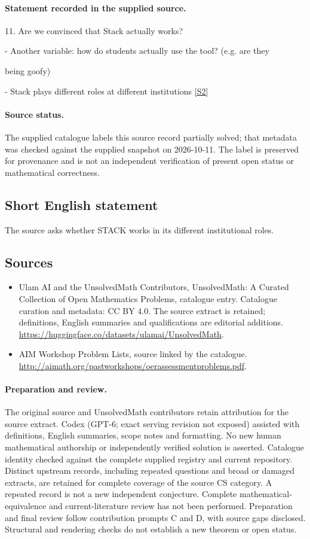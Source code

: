\documentclass[11pt]{article}
\begin{document}
\paragraph{Statement recorded in the supplied source.}
11. Are we convinced that Stack actually works?

- Another variable: how do students actually use the tool? (e.g. are they

being goofy)

- Stack plays different roles at different institutions \href{http://aimath.org/pastworkshops/oerassessmentproblems.pdf}{[S2]}
\paragraph{Source status.}
The supplied catalogue labels this source record partially solved; that metadata was checked against the supplied snapshot on 2026-10-11. The label is preserved for provenance and is not an independent verification of present open status or mathematical correctness.
\subsection{Short English statement}
The source asks whether STACK works in its different institutional roles.
\subsection{Sources}
\begin{itemize}
\item[S1] Ulam AI and the UnsolvedMath Contributors, UnsolvedMath: A Curated Collection of Open Mathematics Problems, catalogue entry. Catalogue curation and metadata: CC BY 4.0. The source extract is retained; definitions, English summaries and qualifications are editorial additions.
\url{https://huggingface.co/datasets/ulamai/UnsolvedMath}.
\item[S2] AIM Workshop Problem Lists, source linked by the catalogue.
\url{http://aimath.org/pastworkshops/oerassessmentproblems.pdf}.
\end{itemize}
\paragraph{Preparation and review.}
The original source and UnsolvedMath contributors retain attribution for the source extract. Codex (GPT-6; exact serving revision not exposed) assisted with definitions, English summaries, scope notes and formatting. No new human mathematical authorship or independently verified solution is asserted. Catalogue identity checked against the complete supplied registry and current repository. Distinct upstream records, including repeated questions and broad or damaged extracts, are retained for complete coverage of the source CS category. A repeated record is not a new independent conjecture. Complete mathematical-equivalence and current-literature review has not been performed. Preparation and final review follow contribution prompts C and D, with source gaps disclosed. Structural and rendering checks do not establish a new theorem or open status.
\label{end:statement}
\end{document}
